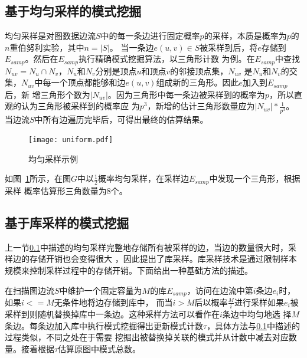 \documentclass[master]{thesis-uestc}
\begin{document}
\subsection{基于均匀采样的模式挖掘}
\label{subsec:uniform}
    均匀采样是对图数据边流$S$中的每一条边进行固定概率$p$的采样，本质是概率为$p$的$n$重伯努利实验，其中$n=|S|$。
当一条边$e(u, v) \in S$被采样到后，将$e$存储到$E_{samp}$。然后在$E_{samp}$执行精确模式挖掘算法，以三角形计数
为例。在$E_{samp}$中查找$N_{uv}=N_u \cap N_v$，$N_u$和$N_v$分别是顶点$u$和顶点$v$的邻接顶点集，$N_{uv}$
是$N_u$和$N_v$的交集，$N_{uv}$中每一个顶点都能够和边$e(u, v)$组成新的三角形。因此$e$加入到$E_{samp}$后，新
增三角形个数为$|N_{uv}|$。因为三角形中每一条边被采样到的概率为$p$，所以直观的认为三角形被采样到的概率应
为$p^3$，新增的估计三角形数量应为$|N_{uv}|*\frac{1}{p^3}$。当边流$S$中所有边遍历完毕后，可得出最终的估算结果。

\begin{figure}
	\texttt{[image: uniform.pdf]}
	\caption{均匀采样示例}
	\label{fig:uniform}
\end{figure}
     如图~\ref{fig:uniform}所示，在图$G$中以$\frac{1}{2}$概率均匀采样，在采样边$E_{samp}$中发现一个三角形，根据采样
概率估算形三角数量为8个。

\subsection{基于库采样的模式挖掘}
\label{subsec:reservoir}
    上一节\ref{subsec:uniform}中描述的均匀采样完整地存储所有被采样的边，当边的数量很大时，采样边的存储开销也会变得很大
，因此提出了库采样。库采样技术是通过限制样本规模来控制采样过程中的存储开销。下面给出一种基础方法的描述。

    在扫描图边流$S$中维护一个固定容量为$M$的库$E_{samp}$，访问在边流中第$i$条边$e_i$时，如果$i<=M$无条件地将边存储到库中，
而当$i>M$后以概率$\frac{M}{i}$进行采样如果$e_i$被采样到则随机替换掉库中一条边。这种采样方法可以看作在$i$条边中均匀地选
择$M$条边。每条边加入库中执行模式挖掘得出更新模式计数$\tau$，具体方法与\ref{subsec:uniform}中描述的过程类似，不同之处在于需要
挖掘出被替换掉关联的模式并从计数中减去对应数量。接着根据$\tau$估算原图中模式总数。
\end{document}
